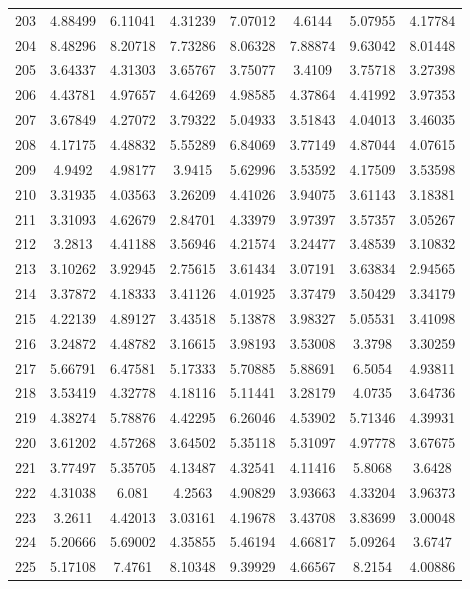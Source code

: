 \begin{center}
\begin{longtable}{cccccccc}
203 & 4.88499 & 6.11041 & 4.31239 & 7.07012 & 4.6144 & 5.07955 & 4.17784\\
204 & 8.48296 & 8.20718 & 7.73286 & 8.06328 & 7.88874 & 9.63042 & 8.01448\\
205 & 3.64337 & 4.31303 & 3.65767 & 3.75077 & 3.4109 & 3.75718 & 3.27398\\
206 & 4.43781 & 4.97657 & 4.64269 & 4.98585 & 4.37864 & 4.41992 & 3.97353\\
207 & 3.67849 & 4.27072 & 3.79322 & 5.04933 & 3.51843 & 4.04013 & 3.46035\\
208 & 4.17175 & 4.48832 & 5.55289 & 6.84069 & 3.77149 & 4.87044 & 4.07615\\
209 & 4.9492 & 4.98177 & 3.9415 & 5.62996 & 3.53592 & 4.17509 & 3.53598\\
210 & 3.31935 & 4.03563 & 3.26209 & 4.41026 & 3.94075 & 3.61143 & 3.18381\\
211 & 3.31093 & 4.62679 & 2.84701 & 4.33979 & 3.97397 & 3.57357 & 3.05267\\
212 & 3.2813 & 4.41188 & 3.56946 & 4.21574 & 3.24477 & 3.48539 & 3.10832\\
213 & 3.10262 & 3.92945 & 2.75615 & 3.61434 & 3.07191 & 3.63834 & 2.94565\\
214 & 3.37872 & 4.18333 & 3.41126 & 4.01925 & 3.37479 & 3.50429 & 3.34179\\
215 & 4.22139 & 4.89127 & 3.43518 & 5.13878 & 3.98327 & 5.05531 & 3.41098\\
216 & 3.24872 & 4.48782 & 3.16615 & 3.98193 & 3.53008 & 3.3798 & 3.30259\\
217 & 5.66791 & 6.47581 & 5.17333 & 5.70885 & 5.88691 & 6.5054 & 4.93811\\
218 & 3.53419 & 4.32778 & 4.18116 & 5.11441 & 3.28179 & 4.0735 & 3.64736\\
219 & 4.38274 & 5.78876 & 4.42295 & 6.26046 & 4.53902 & 5.71346 & 4.39931\\
220 & 3.61202 & 4.57268 & 3.64502 & 5.35118 & 5.31097 & 4.97778 & 3.67675\\
221 & 3.77497 & 5.35705 & 4.13487 & 4.32541 & 4.11416 & 5.8068 & 3.6428\\
222 & 4.31038 & 6.081 & 4.2563 & 4.90829 & 3.93663 & 4.33204 & 3.96373\\
223 & 3.2611 & 4.42013 & 3.03161 & 4.19678 & 3.43708 & 3.83699 & 3.00048\\
224 & 5.20666 & 5.69002 & 4.35855 & 5.46194 & 4.66817 & 5.09264 & 3.6747\\
225 & 5.17108 & 7.4761 & 8.10348 & 9.39929 & 4.66567 & 8.2154 & 4.00886\\

\end{longtable}
\end{center}
